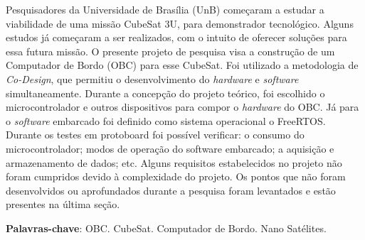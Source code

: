 \begin{resumo}
	
Pesquisadores da Universidade de Brasília (UnB) começaram a estudar a viabilidade de uma missão CubeSat 3U, para demonstrador tecnológico. Alguns estudos já começaram a ser realizados, com o intuito de oferecer soluções para essa futura missão. O presente projeto de pesquisa visa a construção de um Computador de Bordo (OBC) para esse CubeSat. Foi utilizado a metodologia de \textit{Co-Design}, que permitiu o desenvolvimento do \textit{hardware} e \textit{software} simultaneamente. Durante a concepção do projeto teórico, foi escolhido o microcontrolador e outros dispositivos para compor o \textit{hardware} do OBC. Já para o \textit{software} embarcado foi definido como sistema operacional o FreeRTOS. Durante os testes em protoboard foi possível verificar: o consumo do microcontrolador; modos de operação do software embarcado; a aquisição e armazenamento de dados; etc. Alguns requisitos estabelecidos no projeto não foram cumpridos devido à complexidade do projeto. Os pontos que não foram desenvolvidos ou aprofundados durante a pesquisa foram levantados e estão presentes na última seção. 

 \vspace{\onelineskip}
    
 \noindent
 \textbf{Palavras-chave}: OBC. CubeSat. Computador de Bordo. Nano Satélites.

\end{resumo}
